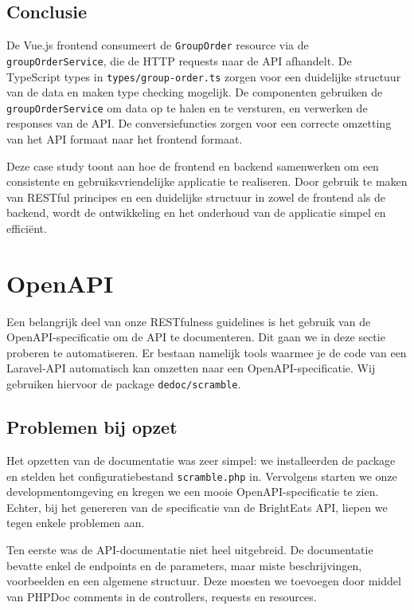 \subsection{Conclusie}

De Vue.js frontend consumeert de \texttt{GroupOrder} resource via de \texttt{groupOrderService}, die de HTTP requests naar de API afhandelt. De TypeScript types in \texttt{types/group-order.ts} zorgen voor een duidelijke structuur van de data en maken type checking mogelijk. De componenten gebruiken de \texttt{groupOrderService} om data op te halen en te versturen, en verwerken de responses van de API. De conversiefuncties zorgen voor een correcte omzetting van het API formaat naar het frontend formaat.

Deze case study toont aan hoe de frontend en backend samenwerken om een consistente en gebruiksvriendelijke applicatie te realiseren. Door gebruik te maken van RESTful principes en een duidelijke structuur in zowel de frontend als de backend, wordt de ontwikkeling en het onderhoud van de applicatie simpel en efficiënt.

\section{OpenAPI}

Een belangrijk deel van onze RESTfulness guidelines is het gebruik van de OpenAPI-specificatie om de API te documenteren. Dit gaan we in deze sectie proberen te automatiseren. Er bestaan namelijk tools waarmee je de code van een Laravel-API automatisch kan omzetten naar een OpenAPI-specificatie. Wij gebruiken hiervoor de package \texttt{dedoc/scramble}.

\subsection{Problemen bij opzet}

Het opzetten van de documentatie was zeer simpel: we installeerden de package en stelden het configuratiebestand \texttt{scramble.php} in. Vervolgens starten we onze developmentomgeving en kregen we een mooie OpenAPI-specificatie te zien. Echter, bij het genereren van de specificatie van de Bright\-Eats API, liepen we tegen enkele problemen aan.

\bigskip

Ten eerste was de API-documentatie niet heel uitgebreid. De documentatie bevatte enkel de endpoints en de parameters, maar miste beschrijvingen, voorbeelden en een algemene structuur. Deze moesten we toevoegen door middel van PHPDoc comments in de controllers, requests en resources.

